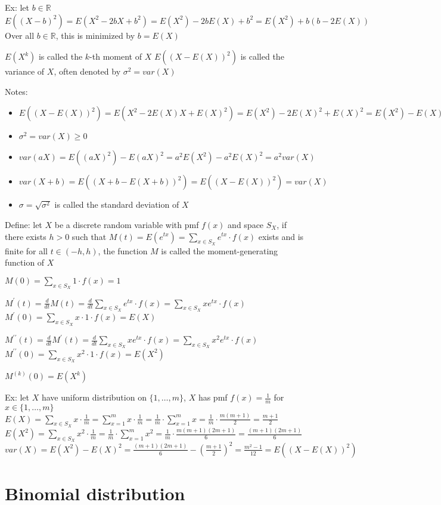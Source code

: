 \documentclass{article}
\begin{document}
Ex: let $b\in\mathbb{R}$
$E((X-b)^2)=E(X^2-2bX+b^2)=E(X^2)-2bE(X)+b^2=E(X^2)+b(b-2E(X))$
Over all $b\in\mathbb{R}$, this is minimized by $b=E(X)$

$E(X^k)$ is called the $k$-th moment of $X$
$E((X-E(X))^2)$ is called the variance of $X$, often denoted by $\sigma^2=var(X)$

Notes:
\begin{itemize}
    \item $E((X-E(X))^2)=E(X^2-2E(X)X+E(X)^2)=E(X^2)-2E(X)^2+E(X)^2=E(X^2)-E(X)^2$
    \item $\sigma^2=var(X)\ge0$
    \item $var(aX)=E((aX)^2)-E(aX)^2=a^2E(X^2)-a^2E(X)^2=a^2var(X)$
    \item $var(X+b)=E((X+b-E(X+b))^2)=E((X-E(X))^2)=var(X)$
    \item $\sigma=\sqrt{\sigma^2}$ is called the standard deviation of $X$
\end{itemize}

Define: let $X$ be a discrete random variable with pmf $f(x)$ and space $S_X$, if there exists $h>0$ such that $M(t)=E(e^{tx})=\sum_{x\in S_X}e^{tx}\cdot f(x)$ exists and is finite for all $t\in(-h,h)$, the function $M$ is called the moment-generating function of $X$

$M(0)=\sum_{x\in S_X}1\cdot f(x)=1$

$M^\prime(t)=\frac{d}{dt}M(t)=\frac{d}{dt}\sum_{x\in S_X}e^{tx}\cdot f(x)=\sum_{x\in S_X}xe^{tx}\cdot f(x)$
$M^\prime(0)=\sum_{x\in S_X}x\cdot1\cdot f(x)=E(X)$

$M^{\prime\prime}(t)=\frac{d}{dt}M^\prime(t)=\frac{d}{dt}\sum_{x\in S_X}xe^{tx}\cdot f(x)=\sum_{x\in S_X}x^2e^{tx}\cdot f(x)$
$M^{\prime\prime}(0)=\sum_{x\in S_X}x^2\cdot1\cdot f(x)=E(X^2)$

$M^{(k)}(0)=E(X^k)$

Ex: let $X$ have uniform distribution on $\{1,\dots,m\}$, $X$ has pmf $f(x)=\frac{1}{m}$ for $x\in\{1,\dots,m\}$
$E(X)=\sum_{x\in S_X}x\cdot\frac{1}{m}=\sum_{x=1}^mx\cdot\frac{1}{m}=\frac{1}{m}\cdot\sum_{x=1}^mx=\frac{1}{m}\cdot\frac{m(m+1)}{2}=\frac{m+1}{2}$
$E(X^2)=\sum_{x\in S_X}x^2\cdot\frac{1}{m}=\frac{1}{m}\cdot\sum_{x=1}^mx^2=\frac{1}{m}\cdot\frac{m(m+1)(2m+1)}{6}=\frac{(m+1)(2m+1)}{6}$
$var(X)=E(X^2)-E(X)^2=\frac{(m+1)(2m+1)}{6}-(\frac{m+1}{2})^2=\frac{m^2-1}{12}=E((X-E(X))^2)$

\section{Binomial distribution}
\end{document}
